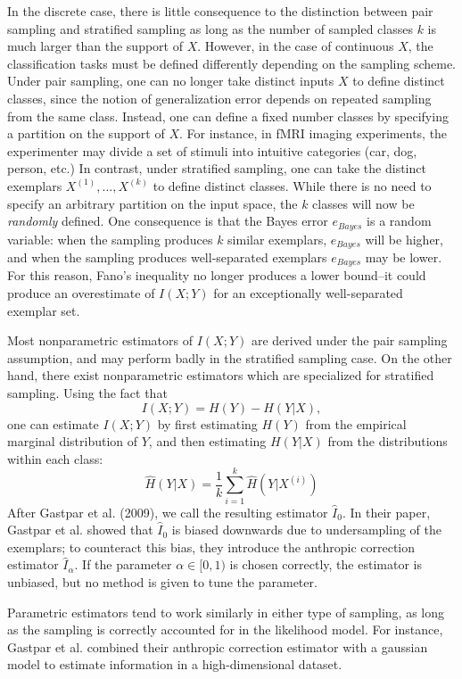 \documentclass{article}
\begin{document}
In the discrete case, there is little consequence to the distinction between pair sampling and stratified sampling as long as the number of sampled classes $k$ is much larger than the support of $X$.
However, in the case of continuous $X$, the classification tasks must be defined differently depending on the sampling scheme.  Under pair sampling, one can no longer take distinct inputs $X$ to define distinct classes, since the notion of generalization error depends on repeated sampling from the same class.  Instead, one can define a fixed number classes by specifying a partition on the support of $X$.  For instance, in fMRI imaging experiments, the experimenter may divide a set of stimuli into intuitive categories (car, dog, person, etc.)  In contrast, under stratified sampling, one can take the distinct exemplars $X^{(1)},\hdots, X^{(k)}$ to define distinct classes.  While there is no need to specify an arbitrary partition on the input space, the $k$ classes will now be \emph{randomly} defined.  One consequence is that the Bayes error $e_{Bayes}$ is a random variable: when the sampling produces $k$ similar exemplars, $e_{Bayes}$ will be higher, and when the sampling produces well-separated exemplars $e_{Bayes}$ may be lower.  For this reason, Fano's inequality no longer produces a lower bound--it could produce an overestimate of $I(X; Y)$ for an exceptionally well-separated exemplar set.

Most nonparametric estimators of $I(X; Y)$ are derived under the pair sampling assumption, and may perform badly in the stratified sampling case.  On the other hand, there exist nonparametric estimators which are specialized for stratified sampling.  Using the fact that
\[
I(X; Y) = H(Y) - H(Y|X),
\]
one can estimate $I(X; Y)$ by first estimating $H(Y)$ from the empirical marginal distribution of $Y$, and then estimating $H(Y|X)$ from the distributions within each class:
\[
\hat{H}(Y|X)  = \frac{1}{k} \sum_{i=1}^k \hat{H}(Y|X^{(i)})
\]
After Gastpar et al. (2009), we call the resulting estimator $\hat{I}_0$.
In their paper, Gastpar et al. showed that $\hat{I}_0$ is biased downwards due to undersampling of the exemplars;
to counteract this bias, they introduce the anthropic correction estimator $\hat{I}_\alpha$.
If the parameter $\alpha \in [0, 1)$ is chosen correctly, the estimator is unbiased, but no method is given to tune the parameter.

Parametric estimators tend to work similarly in either type of sampling,
as long as the sampling is correctly accounted for in the likelihood model.
For instance, Gastpar et al. combined their anthropic correction estimator with a gaussian model
to estimate information in a high-dimensional dataset.
\end{document}
